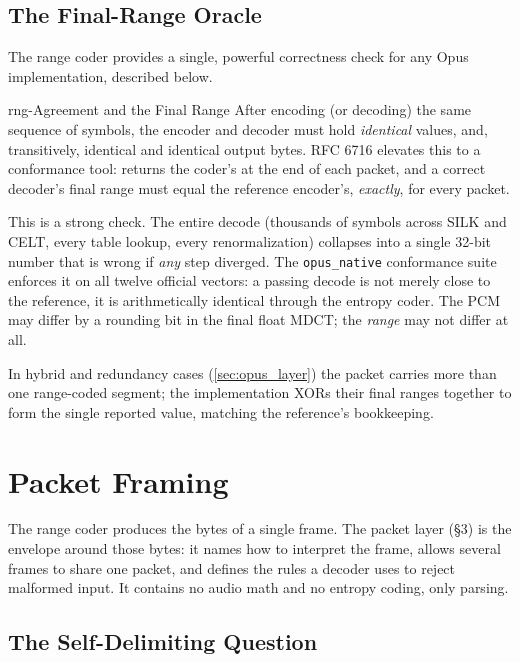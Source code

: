 \subsection{The Final-Range Oracle}\label{subsec:oracle}

The range coder provides a single, powerful correctness check for any Opus
implementation, described below.

\begin{concept}{rng-Agreement and the Final Range}
  After encoding (or decoding) the same sequence of symbols, the encoder and
  decoder must hold \emph{identical}  values, and, transitively,
  identical  and identical output bytes. RFC 6716 elevates this to a
  conformance tool:  returns the
  coder's 
  at the end of each packet, and a correct decoder's final range must equal the
  reference encoder's, \emph{exactly}, for every packet.

  This is a strong check. The entire decode (thousands of symbols across SILK
  and CELT, every table lookup, every renormalization) collapses into a single
  32-bit number that is wrong if \emph{any} step diverged. The
  \texttt{opus\_native} conformance suite enforces it on all twelve official
  vectors: a passing decode is not merely close to the reference, it is
  arithmetically identical through the entropy coder. The PCM may differ by a
  rounding bit in the final float MDCT; the \emph{range} may not differ at all.
\end{concept}

In hybrid and redundancy cases (\cref{sec:opus_layer}) the packet carries more
than one range-coded segment; the implementation XORs their final ranges
together to form the single reported value, matching the reference's
bookkeeping.

\section{Packet Framing}\label{sec:packet}

The range coder produces the bytes of a single frame. The packet layer
(\S3) is the envelope around those bytes: it names how to interpret the frame,
allows several frames to share one packet, and defines the rules a decoder uses
to reject malformed input. It contains no audio math and no entropy coding, only
parsing.

\subsection{The Self-Delimiting Question}\label{subsec:self_delimit}

